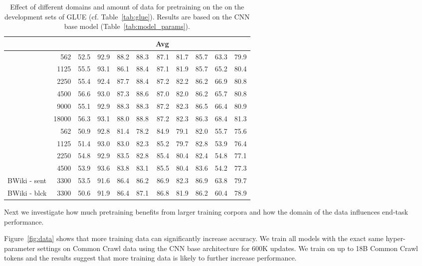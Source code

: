 \documentclass[11pt,a4paper]{article}
\begin{document}
\begin{table*}[t!]
\centering
\begin{tabular}{lrrrrrrrrrr}
\toprule
&  &  &  &  &  & Avg \\
\midrule
{} 
& 562 & 52.5 & 92.9 & 88.2 & 88.3 & 87.1 & 81.7 & 85.7 & 63.3 & 79.9 \\
& 1125 & 55.5 & 93.1 & 86.1 & 88.4 & 87.1 & 81.9 & 85.7 & 65.2 & 80.4 \\
& 2250 & 55.4 & 92.4 & 87.7 & 88.4 & 87.2 & 82.2 & 86.2 & 66.9 & 80.8 \\
& 4500 & 56.6 & 93.0 & 87.3 & 88.6 & 87.0 & 82.0 & 86.2 & 65.7 & 80.8 \\
& 9000 & 55.1 & 92.9 & 88.3 & 88.3 & 87.2 & 82.3 & 86.5 & 66.4 & 80.9 \\
& 18000 & 56.3 & 93.1 & 88.0 & 88.8 & 87.2 & 82.3 & 86.3 & 68.4 & 81.3 \\
\midrule
{} 
& 562 & 50.9 & 92.8 & 81.4 & 78.2 & 84.9 & 79.1 & 82.0 & 55.7 & 75.6 \\
& 1125 & 51.4 & 93.0 & 83.0 & 82.3 & 85.2 & 79.7 & 82.8 & 53.9 & 76.4 \\
& 2250 & 54.8 & 92.9 & 83.5 & 82.8 & 85.4 & 80.4 & 82.4 & 54.8 & 77.1 \\
& 4500 & 53.9 & 93.6 & 83.8 & 83.1 & 85.5 & 80.4 & 83.6 & 54.2 & 77.3 \\
\midrule
BWiki - sent & 3300 & 53.5 & 91.6 & 86.4 & 86.2 & 86.9 & 82.3 & 86.9 & 63.8 & 79.7 \\
BWiki - blck & 3300 & 50.6 & 91.9 & 86.4 & 87.1 & 86.8 & 81.9 & 86.2 & 60.4 & 78.9 \\
\bottomrule
\end{tabular}
\caption{Effect of different domains and amount of data for pretraining on the on the development sets of GLUE (cf. Table~\ref{tab:glue}). Results are based on the CNN base model (Table~\ref{tab:model_params}).
}
\label{tab:data}
\end{table*}



Next we investigate how much pretraining benefits from larger training corpora and how the domain of the data influences end-task performance.

Figure~\ref{fig:data} shows that more training data can significantly increase accuracy. 
We train all models with the exact same hyper-parameter settings on Common Crawl data using the CNN base architecture for 600K updates.
We train on up to 18B Common Crawl tokens and the results suggest that more training data is likely to further increase performance.
\end{document}
